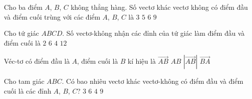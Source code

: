 

\begin{ex}%
	Cho ba điểm $A$, $B$, $C$ không thẳng hàng. Số vectơ khác vectơ không  có điểm đầu và điểm cuối trùng với các điểm $A$, $B$, $C$ là
	\choice 
		{$3$} 
		 {$5$}
		 {\True $6$}
		 {$9$}
\end{ex}

\begin{ex}%
	Cho tứ giác  $ABCD$. Số vectơ-không nhận các đỉnh của tứ giác làm điểm đầu và điểm cuối là
	\choice 
		 {$2$}
		 {$6$}
		{\True $4$} 
		{$12$} 
\end{ex}

\begin{ex}%
	Véc-tơ có điểm đầu là $A$, điểm cuối là $B$  kí hiệu là
	 \choice
		{\True $\overrightarrow{AB}$} 
		{$AB$} 
		 {$|\overrightarrow{AB}|$}
		 {$\overrightarrow{BA}$}
\end{ex}

\begin{ex}%
	Cho tam giác $ABC$. Có bao nhiêu vectơ khác vectơ-không có điểm đầu và điểm cuối là  các đỉnh $A$, $B$, $C$?
	\choice 
		{$3$} 
		{\True $6$} 
		 {$4$}
		 {$9$}
\end{ex}


